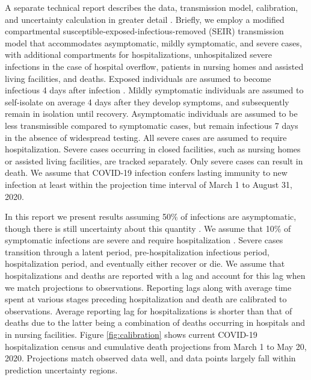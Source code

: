 \documentclass[11pt]{article}
\begin{document}
A separate technical report describes the data, transmission model, calibration, and uncertainty calculation in greater detail \citep{morozova2020tech}.  Briefly, we employ a modified compartmental susceptible-exposed-infectious-removed (SEIR) transmission model that accommodates asymptomatic, mildly symptomatic, and severe cases, with additional compartments for hospitalizations, unhospitalized severe infections in the case of hospital overflow, patients in nursing homes and assisted living facilities, and deaths. Exposed individuals are assumed to become infectious 4 days after infection \citep{lauer2020incubation, bi2020epidemiology, li2020early, linton2020incubation, he2020estimation, salje2020estimating, wei2020presymptomatic}.  Mildly symptomatic individuals are assumed to self-isolate on average 4 days after they develop symptoms, and subsequently remain in isolation until recovery. Asymptomatic individuals are assumed to be less transmissible compared to symptomatic cases, but remain infectious 7 days in the absence of widespread testing. All severe cases are assumed to require hospitalization. Severe cases occurring in closed facilities, such as nursing homes or assisted living facilities, are tracked separately. Only severe cases can result in death. We assume that COVID-19 infection confers lasting immunity to new infection at least within the projection time interval of March 1 to August 31, 2020.  

In this report we present results assuming 50\% of infections are asymptomatic, though there is still uncertainty about this quantity \citep{he2020estimation, nishiura2020estimation, mizumoto2020estimating, emery2020contribution}.  We assume that 10\% of symptomatic infections are severe and require hospitalization \citep{verity2020estimates, bi2020epidemiology, salje2020estimating}.  Severe cases transition through a latent period, pre-hospitalization infectious period, hospitalization period, and eventually either recover or die. We assume that hospitalizations and deaths are reported with a lag and account for this lag when we match projections to observations. Reporting lags along with average time spent at various stages preceding hospitalization and death are calibrated to observations. Average reporting lag for hospitalizations is shorter than that of deaths due to the latter being a combination of deaths occurring in hospitals and in nursing facilities.  Figure \ref{fig:calibration} shows current COVID-19 hospitalization census and cumulative death projections from March 1 to May 20, 2020.  Projections match observed data well, and data points largely fall within prediction uncertainty regions.  
\end{document}
